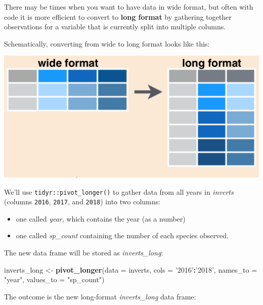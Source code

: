 \documentclass[]{book}
\newenvironment{Shaded}{\begin{snugshade}}{\end{snugshade}}
\newcommand{\DataTypeTok}[1]{\textcolor[rgb]{0.13,0.29,0.53}{#1}}
\newcommand{\KeywordTok}[1]{\textcolor[rgb]{0.13,0.29,0.53}{\textbf{#1}}}
\newcommand{\NormalTok}[1]{#1}
\newcommand{\OperatorTok}[1]{\textcolor[rgb]{0.81,0.36,0.00}{\textbf{#1}}}
\newcommand{\StringTok}[1]{\textcolor[rgb]{0.31,0.60,0.02}{#1}}
\providecommand{\tightlist}{%
  \setlength{\itemsep}{0pt}\setlength{\parskip}{0pt}}
\begin{document}
There may be times when you want to have data in wide format, but often with code it is more efficient to convert to \textbf{long format} by gathering together observations for a variable that is currently split into multiple columns.

Schematically, converting from wide to long format looks like this:

\includegraphics{img/tidyr_pivot_longer.png}

We'll use \texttt{tidyr::pivot\_longer()} to gather data from all years in \emph{inverts} (columns \texttt{2016}, \texttt{2017}, and \texttt{2018}) into two columns:

\begin{itemize}
\tightlist
\item
  one called \emph{year}, which contains the year (as a number)
\item
  one called \emph{sp\_count} containing the number of each species observed.
\end{itemize}

The new data frame will be stored as \emph{inverts\_long}:

\begin{Shaded}
\begin{Highlighting}[]
\NormalTok{inverts_long <-}\StringTok{ }\KeywordTok{pivot_longer}\NormalTok{(}\DataTypeTok{data =}\NormalTok{ inverts, }
                                    \DataTypeTok{cols =} \StringTok{'2016'}\OperatorTok{:}\StringTok{'2018'}\NormalTok{,}
                                    \DataTypeTok{names_to =} \StringTok{"year"}\NormalTok{,}
                                    \DataTypeTok{values_to =} \StringTok{"sp_count"}\NormalTok{)}
\end{Highlighting}
\end{Shaded}

The outcome is the new long-format \emph{inverts\_long} data frame:
\end{document}
